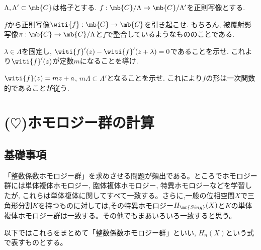 \begin{egprob}
$\Lambda, \Lambda' \subset \mb{C}$は格子とする. $f:\mb{C}/\Lambda\to \mb{C}/\Lambda'$を正則写像とする. 
\ben 
\item $f$から正則写像$\witi{f}: \mb{C} \to \mb{C}$を引き起こせ. もちろん, 被覆射影写像$\pi:\mb{C}\to\mb{C}/\Lambda$と$f$で整合しているようなもののことである. 
\item $\lambda\in \Lambda$を固定し, $\witi{f}'(z) - \witi{f}'(z+\lambda) = 0 $であることを示せ. これより$\witi{f}'(z)$が定数$m$になることを導け. 
\item $\witi{f}(z) = mz + a$, $m\Lambda \subset \Lambda'$となることを示せ. これにより$f$の形は一次関数的であることが従う. 
\een 

\end{egprob}

\begin{egans}
\end{egans}













\clearpage
\section{($\heartsuit$)ホモロジー群の計算}
\subsection{基礎事項}
「整数係数ホモロジー群」を求めさせる問題が頻出である。ところでホモロジー群には単体複体ホモロジー, 胞体複体ホモロジー, 特異ホモロジーなどを学習したが, これらは単体複体に関してすべて一致する。さらに,一般の位相空間$X$で三角形分割$K$を持つものに対しては,その特異ホモロジー$H_{\mr{Sing}}(X)$と$K$の単体複体ホモロジー群は一致する。その他でもまあいろいろ一致すると思う。

以下ではこれらをまとめて「整数係数ホモロジー群」といい, $H_{n}(X)$という式で表すものとする。

